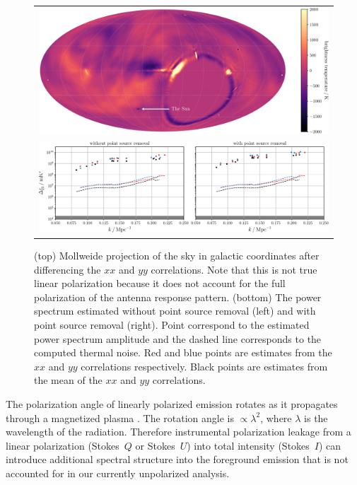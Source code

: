 \begin{bibunit}
\begin{figure}
    \centering
    \begin{tabular}{c}
        \includegraphics[width=\textwidth]{figures/chapter4/xx-yy-sky-map-colorbar}\\
        \includegraphics[width=\textwidth]{figures/chapter4/spherical-power-spectrum-xx-yy}\\
    \end{tabular}
    \caption{
        (top) Mollweide projection of the sky in galactic coordinates after differencing the $xx$
        and $yy$ correlations. Note that this is not true linear polarization because it does not
        account for the full polarization of the antenna response pattern.
        (bottom) The power spectrum estimated without point source removal (left) and with point
        source removal (right). Point correspond to the estimated power spectrum amplitude and the
        dashed line corresponds to the computed thermal noise. Red and blue points are estimates
        from the $xx$ and $yy$ correlations respectively. Black points are estimates from the mean
        of the $xx$ and $yy$ correlations.
    }
    \label{fig:spherical-power-spectrum-xx-yy}
\end{figure}

The polarization angle of linearly polarized emission rotates as it propagates through a magnetized
plasma \citep[e.g.,][]{2014A&A...568A.101J}. The rotation angle is $\propto\lambda^2$, where
$\lambda$ is the wavelength of the radiation. Therefore instrumental polarization leakage from a
linear polarization (Stokes~$Q$ or Stokes~$U$) into total intensity (Stokes~$I$) can introduce
additional spectral structure into the foreground emission that is not accounted for in our
currently unpolarized analysis.


\end{bibunit}
